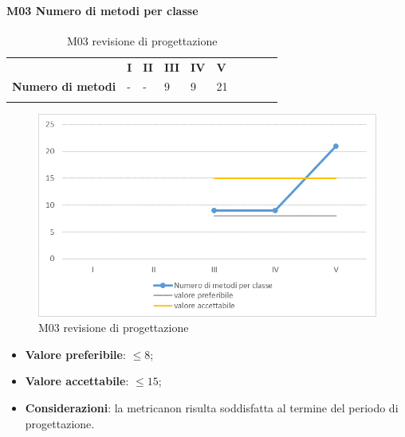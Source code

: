 \paragraph{M03 Numero di metodi per classe} \mbox{}
\begin{longtable}[H!] {						
		>{}p{50mm}  		
		>{}p{8mm}
		>{}p{8mm}		
		>{}p{8mm}		
		>{}p{8mm}		
		>{}p{8mm}		
		>{}p{8mm}
		>{}p{8mm}
		>{}p{8mm}
		>{}p{8mm}
	}
	\rowcolor{gray!50}
	\textbf{} & \textbf{I} & \textbf{II} & \textbf{III} & \textbf{IV} & \textbf{V} \TBstrut \\ [2mm]
	\textbf{Numero di metodi} & - & - & 9 & 9 & 21 \TBstrut \\ [2mm]
	\rowcolor{white}
	\caption{M03 revisione di progettazione\glo}
\end{longtable}
\begin{figure}[H] 	
\includegraphics[width=\linewidth]{./img/grafici/RP3.png}	
\caption{M03 revisione di progettazione\glo}	
\end{figure}
\begin{itemize}
	\item \textbf{Valore preferibile}: $\le8$;
	\item \textbf{Valore accettabile}: $\le15$;
	\item \textbf{Considerazioni}: la metrica\glosp non risulta soddisfatta al termine del periodo di progettazione\glo.
\end{itemize}

